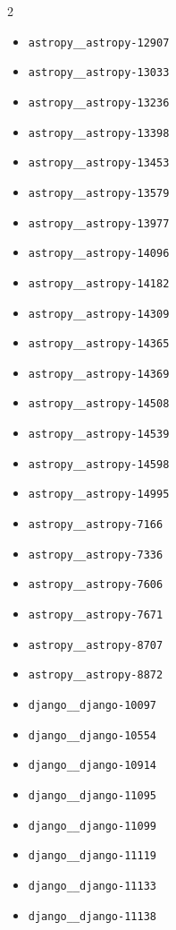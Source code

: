 \documentclass{article}
\begin{document}
\begin{multicols}{2}
\begin{itemize}
    \item \texttt{astropy\_\_astropy-12907}
    \item \texttt{astropy\_\_astropy-13033}
    \item \texttt{astropy\_\_astropy-13236}
    \item \texttt{astropy\_\_astropy-13398}
    \item \texttt{astropy\_\_astropy-13453}
    \item \texttt{astropy\_\_astropy-13579}
    \item \texttt{astropy\_\_astropy-13977}
    \item \texttt{astropy\_\_astropy-14096}
    \item \texttt{astropy\_\_astropy-14182}
    \item \texttt{astropy\_\_astropy-14309}
    \item \texttt{astropy\_\_astropy-14365}
    \item \texttt{astropy\_\_astropy-14369}
    \item \texttt{astropy\_\_astropy-14508}
    \item \texttt{astropy\_\_astropy-14539}
    \item \texttt{astropy\_\_astropy-14598}
    \item \texttt{astropy\_\_astropy-14995}
    \item \texttt{astropy\_\_astropy-7166}
    \item \texttt{astropy\_\_astropy-7336}
    \item \texttt{astropy\_\_astropy-7606}
    \item \texttt{astropy\_\_astropy-7671}
    \item \texttt{astropy\_\_astropy-8707}
    \item \texttt{astropy\_\_astropy-8872}
    \item \texttt{django\_\_django-10097}
    \item \texttt{django\_\_django-10554}
    \item \texttt{django\_\_django-10914}
    \item \texttt{django\_\_django-11095}
    \item \texttt{django\_\_django-11099}
    \item \texttt{django\_\_django-11119}
    \item \texttt{django\_\_django-11133}
    \item \texttt{django\_\_django-11138}

\end{itemize}
\end{multicols}
\end{document}

